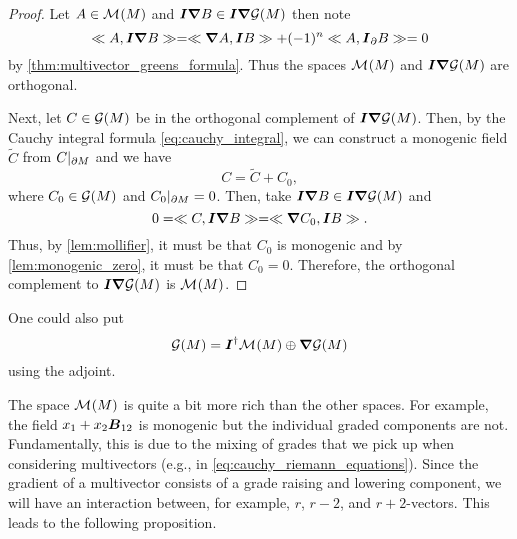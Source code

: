 \begin{proof}
Let $A \in \mathcal{M}^{}(M)$ and $\boldsymbol{I}\boldsymbol{\nabla} B\in \boldsymbol{I} \boldsymbol{\nabla} \mathcal{G}(M)$ then note
\begin{equation}
\ll A, \boldsymbol{I} \boldsymbol{\nabla} B\gg = \ll \boldsymbol{\nabla} A, \boldsymbol{I} B\gg + (-1)^{n} \ll A, \boldsymbol{I}_\partial B\gg = 0
\end{equation}
by \cref{thm:multivector_greens_formula}. Thus the spaces $\mathcal{M}^{}(M)$ and $\boldsymbol{I}\boldsymbol{\nabla} \mathcal{G}(M)$ are orthogonal. 

Next, let $C\in \mathcal{G}(M)$ be in the orthogonal complement of $\boldsymbol{I} \boldsymbol{\nabla} \mathcal{G}(M)$. Then, by the Cauchy integral formula \cref{eq:cauchy_integral},  we can construct a monogenic field $\tilde{C}$ from $C\vert_{\partial M}$ and we have
\begin{equation}
C = \tilde{C} + C_0,
\end{equation}
where $C_0\in \mathcal{G}(M)$ and $C_0\vert_{\partial M} =0$. Then, take $\boldsymbol{I} \boldsymbol{\nabla} B \in \boldsymbol{I} \boldsymbol{\nabla} \mathcal{G}(M)$ and
\begin{equation}
0 = \ll C, \boldsymbol{I} \boldsymbol{\nabla} B\gg = \ll \boldsymbol{\nabla} C_0, \boldsymbol{I} B\gg.
\end{equation}
Thus, by  \cref{lem:mollifier}, it must be that $C_0$ is monogenic and by \cref{lem:monogenic_zero}, it must be that $C_0=0$. Therefore, the orthogonal complement to $\boldsymbol{I} \boldsymbol{\nabla} \mathcal{G}(M)$ is $\mathcal{M}^{}(M)$.
\end{proof}
\begin{remark}
One could also put
\begin{equation}
\mathcal{G}(M) = \boldsymbol{I}^{\dagger} \mathcal{M}^{}(M) \oplus \boldsymbol{\nabla} \mathcal{G}(M)
\end{equation}
using the adjoint.
\end{remark}

The space $\mathcal{M}^{}(M)$ is quite a bit more rich than the other spaces.  For example, the field $x_1+x_2 \boldsymbol{B}_{12}$ is monogenic but the individual graded components are not. Fundamentally, this is due to the mixing of grades that we pick up when considering multivectors (e.g., in \cref{eq:cauchy_riemann_equations}). Since the gradient of a multivector consists of a grade raising and lowering component, we will have an interaction between, for example, $r$, $r-2$, and $r+2$-vectors. This leads to the following proposition.

